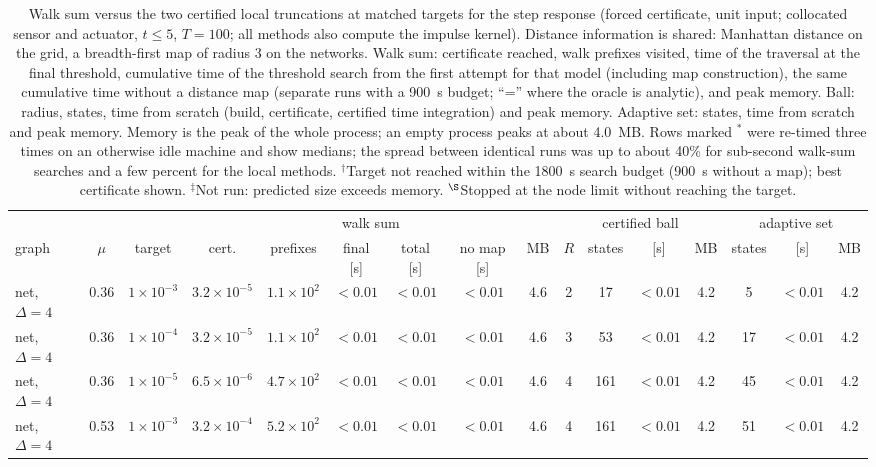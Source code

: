 \documentclass[aps,pra,superscriptaddress,floatfix,longbibliography,twocolumn]{revtex4-2}
\begin{document}
\begin{table}[t]
\footnotesize\setlength{\tabcolsep}{1.35pt}
\caption{Walk sum versus the two certified local truncations at matched targets for the step response (forced certificate, unit input; collocated sensor and actuator, $t\le5$, $T=100$; all methods also compute the impulse kernel). Distance information is shared: Manhattan distance on the grid, a breadth-first map of radius 3 on the networks. Walk sum: certificate reached, walk prefixes visited, time of the traversal at the final threshold, cumulative time of the threshold search from the first attempt for that model (including map construction), the same cumulative time without a distance map (separate runs with a 900~s budget; ``='' where the oracle is analytic), and peak memory. Ball: radius, states, time from scratch (build, certificate, certified time integration) and peak memory. Adaptive set: states, time from scratch and peak memory. Memory is the peak of the whole process; an empty process peaks at about 4.0~MB. Rows marked $^*$ were re-timed three times on an otherwise idle machine and show medians; the spread between identical runs was up to about 40\% for sub-second walk-sum searches and a few percent for the local methods. $^\dagger$Target not reached within the 1800~s search budget (900~s without a map); best certificate shown. $^\ddagger$Not run: predicted size exceeds memory. $^\S$Stopped at the node limit without reaching the target.}\label{tab:crossover}
\begin{ruledtabular}
\begin{tabular}{lcc|cccccc|cccc|ccc}
 & & & \multicolumn{6}{c|}{walk sum} & \multicolumn{4}{c|}{certified ball} & \multicolumn{3}{c}{adaptive set}\\
graph & $\mu$ & target & cert. & prefixes & final [s] & total [s] & no map [s] & MB & $R$ & states & [s] & MB & states & [s] & MB\\\hline
net, $\Delta=4$ & 0.36 & $1\times10^{-3}$ & $3.2\times10^{-5}$ & $1.1\times10^{2}$ & $<0.01$ & $<0.01$ & $<0.01$ & 4.6 & 2 & 17 & $<0.01$ & 4.2 & 5 & $<0.01$ & 4.2 \\
net, $\Delta=4$ & 0.36 & $1\times10^{-4}$ & $3.2\times10^{-5}$ & $1.1\times10^{2}$ & $<0.01$ & $<0.01$ & $<0.01$ & 4.6 & 3 & 53 & $<0.01$ & 4.2 & 17 & $<0.01$ & 4.2 \\
net, $\Delta=4$ & 0.36 & $1\times10^{-5}$ & $6.5\times10^{-6}$ & $4.7\times10^{2}$ & $<0.01$ & $<0.01$ & $<0.01$ & 4.6 & 4 & 161 & $<0.01$ & 4.2 & 45 & $<0.01$ & 4.2 \\
net, $\Delta=4$ & 0.53 & $1\times10^{-3}$ & $3.2\times10^{-4}$ & $5.2\times10^{2}$ & $<0.01$ & $<0.01$ & $<0.01$ & 4.6 & 4 & 161 & $<0.01$ & 4.2 & 51 & $<0.01$ & 4.2 \\

\end{tabular}
\end{ruledtabular}
\end{table}
\end{document}
